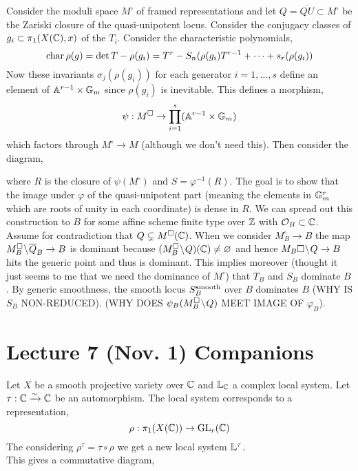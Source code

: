 \documentclass[12pt]{article}
\begin{document}
Consider the moduli space $M^\square$ of framed representations and let $Q = \overline{QU} \subset M^\square$ be the Zariski closure of the quasi-unipotent locus. Consider the conjugacy classes of $g_i \subset \pi_1(X(\mathbb{C}), x)$ of the $T_i$. Consider the characteristic polynomials,
\[ \operatorname{\mathrm{char}}{\rho(g)} = \det{T - \rho(g_i)} = T^r - S_n(\rho(g_i) T^{r-1} + \cdots + s_r(\rho(g_i))  \]
Now these invariants $\sigma_j(\rho(g_i))$ for each generator $i = 1, \dots, s$ define an element of $\mathbb{A}^{r-1} \times \mathbb{G}_m$ since $\rho(g_i)$ is inevitable. This defines a morphism,
\[ \psi : M^\square \to \prod_{i = 1}^s (\mathbb{A}^{r-1} \times \mathbb{G}_m) \]
which factors through $M^\square \to M$ (although we don't need this). Then consider the diagram,
\begin{center}
\end{center}
where $R$ is the closure of $\psi(M^{\square})$ and $S = \varphi^{-1}(R)$. The goal is to show that the image under $\varphi$ of the quasi-unipotent part (meaning the elements in $\mathbb{G}_m^r$ which are roots of unity in each coordinate) is dense in $R$. We can spread out this construction to $B$ for some affine scheme finite type over $\mathbb{Z}$ with $\mathcal{O}_{B} \subset \mathbb{C}$. 
\bigskip\\
Assume for contradiction that $Q \subsetneq M^{\square}(\mathbb{C})$. When we consider $M^{\square}_B \to B$ the map $M_B^{\square} \! \setminus \! \overline{Q}_B \to B$ is dominant because $(M_B^\square \! \setminus \! Q)(\mathbb{C}) \neq \varnothing$ and hence $M_B \square \! \setminus \! Q \to B$ hits the generic point and thus is dominant. This implies moreover (thought it just seems to me that we need the dominance of $M^\square$) that $T_B$ and $S_B$ dominate $B$. By generic smoothness, the smooth locus $S_B^{\mathrm{smooth}}$ over $B$ dominates $B$ (WHY IS $S_B$ NON-REDUCED). (WHY DOES $\psi_B(M^\square_B \! \setminus \! Q)$ MEET IMAGE OF $\varphi_B$). 

\section{Lecture 7 (Nov. 1) Companions}

Let $X$ be a smooth projective variety over $\mathbb{C}$ and $\mathbb{L}_{\mathbb{C}}$ a complex local system. Let $\tau : \mathbb{C} \xrightarrow{\sim} \mathbb{C}$ be an automorphism. The local system corresponds to a representation,
\[ \rho : \pi_1(X(\mathbb{C})) \to \mathrm{GL}_r(\mathbb{C}) \]
The considering $\rho^{\tau} = \tau \circ \rho$ we get a new local system $\mathbb{L}^\tau$. 
\bigskip\\
This gives a commutative diagram,
\begin{center}
\end{center}
\end{document}
